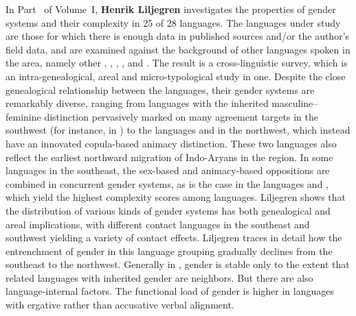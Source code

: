 \documentclass[output=collectionpaper]{langsci/langscibook}
\begin{document}
In Part~\ptsouthasia{} of Volume~I, \textbf{Henrik Liljegren} investigates the properties of gender systems and their complexity in 25 of 28  languages. The languages under study are those for which there is enough data in published sources and/or the author's field data, and are examined against the background of other languages spoken in the area, namely other , , , ,  and . The result is a cross-linguistic survey, which is an intra-genealogical, areal and micro-typological study in one. Despite the close genealogical relationship between the  languages, their gender systems are remarkably diverse, ranging from languages with the inherited masculine--feminine distinction pervasively marked on many agreement targets in the southwest (for instance, in ) to the  languages  and  in the northwest, which instead have an innovated copula-based animacy distinction. These two languages also reflect the earliest northward migration of Indo-Aryans in the region. In some languages in the southeast, the sex-based and animacy-based oppositions are combined in concurrent gender systems, as is the case in the  languages and , which yield the highest complexity scores among  languages. Liljegren shows that the distribution of various kinds of gender systems has both genealogical and areal implications, with different  contact languages in the southeast and southwest yielding a variety of contact effects. Liljegren traces in detail how the entrenchment of gender in this language grouping gradually declines from the southeast to the northwest. Generally in , gender is stable only to the extent that related languages with inherited gender are neighbors. But there are also language-internal factors. The functional load of gender is higher in languages with ergative rather than accusative verbal alignment.
\end{document}
